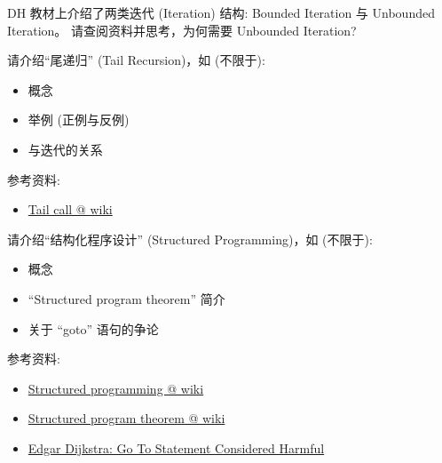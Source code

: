 \documentclass[a4paper, justified]{tufte-handout}
\begin{document}
\begin{problem}
DH 教材上介绍了两类迭代 (Iteration) 结构:
Bounded Iteration 与 Unbounded Iteration。
请查阅资料并思考，为何需要 Unbounded Iteration?
\end{problem}

\begin{solution}
\end{solution}

\beginot

\begin{ot}[尾递归]
  请介绍``尾递归'' (Tail Recursion)，如 (不限于):
  \begin{itemize}
    \item 概念
    \item 举例 (正例与反例)
    \item 与迭代的关系
  \end{itemize}

  \noindent 参考资料:
  \begin{itemize}
    \item \href{https://en.wikipedia.org/wiki/Tail\_call}{Tail call @ wiki}
  \end{itemize}
\end{ot}

\vspace{0.50cm}
\begin{ot}[结构化程序设计]
  请介绍``结构化程序设计'' (Structured Programming)，如 (不限于):
  \begin{itemize}
    \item 概念
    \item ``Structured program theorem'' 简介
    \item 关于 ``goto'' 语句的争论
  \end{itemize}

  \noindent 参考资料:
  \begin{itemize}
    \item \href{https://en.wikipedia.org/wiki/Structured\_programming}{Structured programming @ wiki}
    \item \href{https://en.wikipedia.org/wiki/Structured\_program\_theorem}{Structured program theorem @ wiki}
    \item \href{https://homepages.cwi.nl/~storm/teaching/reader/Dijkstra68.pdf}{Edgar Dijkstra: Go To Statement Considered Harmful}
  \end{itemize}
\end{ot}
\end{document}
